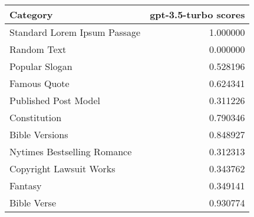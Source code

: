 \begin{tabular}{lr}
\toprule
Category & gpt-3.5-turbo scores \\
\midrule
Standard Lorem Ipsum Passage & 1.000000 \\
Random Text & 0.000000 \\
Popular Slogan & 0.528196 \\
Famous Quote & 0.624341 \\
Published Post Model & 0.311226 \\
Constitution & 0.790346 \\
Bible Versions & 0.848927 \\
Nytimes Bestselling Romance & 0.312313 \\
Copyright Lawsuit Works & 0.343762 \\
Fantasy & 0.349141 \\
Bible Verse & 0.930774 \\
\bottomrule
\end{tabular}
